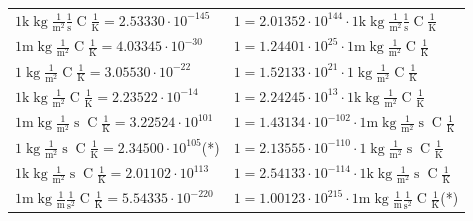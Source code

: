 \begin{center}
\begin{longtable}{l l}
{\color{gray}$1 \bm{\mathrm{ k}}\operatorname{kg}\frac1{\operatorname{m}^2}\frac1{\operatorname{s}}{\operatorname{C}}\frac1{\operatorname{K}} = 2.53330\cdot10^{-145} $}   & {\color{gray}$ 1 = 2.01352\cdot10^{144} \cdot 1 \bm{\mathrm{ k}}\operatorname{kg}\frac1{\operatorname{m}^2}\frac1{\operatorname{s}}{\operatorname{C}}\frac1{\operatorname{K}}$}  \\
{\color{gray}$1 \bm{\mathrm{ m}}\operatorname{kg}\frac1{\operatorname{m}^2}{}{\operatorname{C}}\frac1{\operatorname{K}} = 4.03345\cdot10^{-30} $}   & {\color{gray}$ 1 = 1.24401\cdot10^{25} \cdot 1 \bm{\mathrm{ m}}\operatorname{kg}\frac1{\operatorname{m}^2}{}{\operatorname{C}}\frac1{\operatorname{K}}$}  \\
{\color{black}$1 \bm{\mathrm{ }}\operatorname{kg}\frac1{\operatorname{m}^2}{}{\operatorname{C}}\frac1{\operatorname{K}} = 3.05530\cdot10^{-22} $}   & {\color{black}$ 1 = 1.52133\cdot10^{21} \cdot 1 \bm{\mathrm{ }}\operatorname{kg}\frac1{\operatorname{m}^2}{}{\operatorname{C}}\frac1{\operatorname{K}}$}  \\
{\color{gray}$1 \bm{\mathrm{ k}}\operatorname{kg}\frac1{\operatorname{m}^2}{}{\operatorname{C}}\frac1{\operatorname{K}} = 2.23522\cdot10^{-14} $}   & {\color{gray}$ 1 = 2.24245\cdot10^{13} \cdot 1 \bm{\mathrm{ k}}\operatorname{kg}\frac1{\operatorname{m}^2}{}{\operatorname{C}}\frac1{\operatorname{K}}$}  \\
{\color{gray}$1 \bm{\mathrm{ m}}\operatorname{kg}\frac1{\operatorname{m}^2}{\operatorname{s}}{\operatorname{C}}\frac1{\operatorname{K}} = 3.22524\cdot10^{101} $}   & {\color{gray}$ 1 = 1.43134\cdot10^{-102} \cdot 1 \bm{\mathrm{ m}}\operatorname{kg}\frac1{\operatorname{m}^2}{\operatorname{s}}{\operatorname{C}}\frac1{\operatorname{K}}$}  \\
{\color{black}$1 \bm{\mathrm{ }}\operatorname{kg}\frac1{\operatorname{m}^2}{\operatorname{s}}{\operatorname{C}}\frac1{\operatorname{K}} = 2.34500\cdot10^{105} $}\quad(*) & {\color{black}$ 1 = 2.13555\cdot10^{-110} \cdot 1 \bm{\mathrm{ }}\operatorname{kg}\frac1{\operatorname{m}^2}{\operatorname{s}}{\operatorname{C}}\frac1{\operatorname{K}}$}  \\
{\color{gray}$1 \bm{\mathrm{ k}}\operatorname{kg}\frac1{\operatorname{m}^2}{\operatorname{s}}{\operatorname{C}}\frac1{\operatorname{K}} = 2.01102\cdot10^{113} $}   & {\color{gray}$ 1 = 2.54133\cdot10^{-114} \cdot 1 \bm{\mathrm{ k}}\operatorname{kg}\frac1{\operatorname{m}^2}{\operatorname{s}}{\operatorname{C}}\frac1{\operatorname{K}}$}  \\
{\color{gray}$1 \bm{\mathrm{ m}}\operatorname{kg}\frac1{\operatorname{m}}\frac1{\operatorname{s}^2}{\operatorname{C}}\frac1{\operatorname{K}} = 5.54335\cdot10^{-220} $}   & {\color{gray}$ 1 = 1.00123\cdot10^{215} \cdot 1 \bm{\mathrm{ m}}\operatorname{kg}\frac1{\operatorname{m}}\frac1{\operatorname{s}^2}{\operatorname{C}}\frac1{\operatorname{K}}$}\quad(*)\\

\end{longtable}
\end{center}
